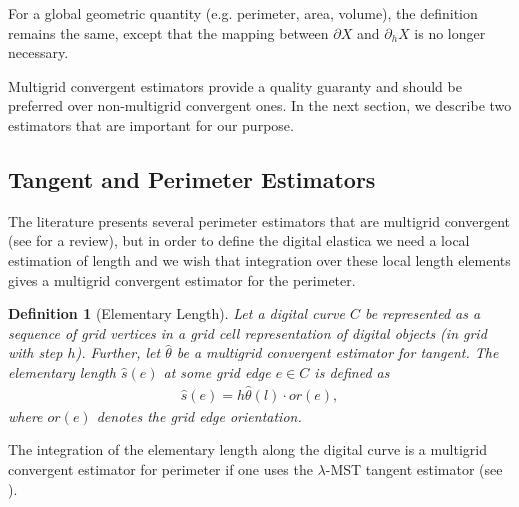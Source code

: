\documentclass[runningheads]{llncs}
\newtheorem{ddef}{Definition}
\begin{document}
For a global geometric quantity (e.g. perimeter, area, volume), the definition remains the same, except that the mapping
between $\partial X$ and $\partial_h X$ is no longer necessary.
	
Multigrid convergent estimators provide a quality guaranty and should be preferred over non-multigrid convergent
ones. In the next section, we describe two estimators that are important for our purpose.

\subsection{Tangent and Perimeter Estimators}

The literature presents several perimeter estimators that are multigrid convergent (see
\cite{coeurjolly04,coeurjolly12} for a review), but in order to define the digital elastica we need a local estimation
of length and we wish that integration over these local length elements gives a multigrid convergent estimator for the
perimeter.

\begin{ddef}[Elementary Length]
  Let a digital curve $C$ be represented as a sequence of grid vertices in a grid cell representation of digital objects (in grid with step $h$). Further, let $\hat{\theta}$ be a multigrid convergent estimator for tangent. The elementary length $\hat{s}(e)$ at some grid edge $e\in C$ is defined as
  \begin{align*}
    \hat{s}(e) = h \hat{\theta}(l) \cdot or(e),
  \end{align*}
  where $or(e)$ denotes the grid edge orientation.
\end{ddef}
The integration of the elementary length along the digital curve is a multigrid convergent estimator for perimeter if
one uses the $\lambda$-MST \cite{lachaud07} tangent estimator (see \cite{lachaud06}).
\end{document}
